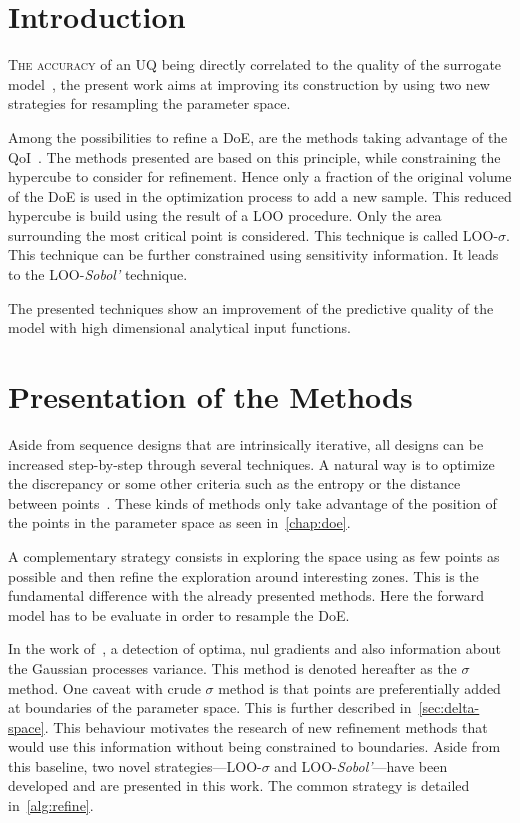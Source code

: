 \section{Introduction}

\lettrine{T}{he accuracy} of an UQ being directly correlated to the quality of the surrogate model~\cite{iooss2010}, the present work aims at improving its construction by using two new strategies for resampling the parameter space.

Among the possibilities to refine a DoE, are the methods taking advantage of the QoI~\cite{Garud2017}. The methods presented are based on this principle, while constraining the hypercube to consider for refinement. Hence only a fraction of the original volume of the DoE is used in the optimization process to add a new sample. This reduced hypercube is build using the result of a LOO procedure. Only the area surrounding the most critical point is considered. This technique is called LOO-$\sigma$. This technique can be further constrained using sensitivity information. It leads to the LOO-\textit{Sobol'} technique.

The presented techniques show an improvement of the predictive quality of the model with high dimensional analytical input functions.

\section{Presentation of the Methods}

Aside from sequence designs that are intrinsically iterative, all designs can be increased step-by-step through several techniques. A natural way is to optimize the discrepancy or some other criteria such as the entropy or the distance between points~\cite{Fang2006}. These kinds of methods only take advantage of the position of the points in the parameter space as seen in~\cref{chap:doe}.

A complementary strategy consists in exploring the space using as few points as possible and then refine the exploration around interesting zones. This is the fundamental difference with the already presented methods. Here the forward model has to be evaluate in order to resample the DoE.

In the work of~\cite{scheidt2006,braconnier2011}, a detection of optima, nul gradients and also information about the Gaussian processes variance. This method is denoted hereafter as the $\sigma$ method. One caveat with crude $\sigma$ method is that points are preferentially added at boundaries of the parameter space. This is further described in~\cref{sec:delta-space}. This behaviour motivates the research of new refinement methods that would use this information without being constrained to boundaries. Aside from this baseline, two novel strategies---LOO-$\sigma$ and LOO-\textit{Sobol'}---have been developed and are presented in this work. The common strategy is detailed in~\cref{alg:refine}.

